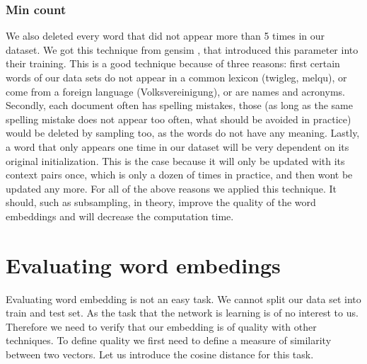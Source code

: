 \subsubsection{Min count}
We also deleted every word that did not appear more than 5 times in our dataset. We got this technique from gensim \cite{gensim}, that introduced this parameter into their training. This is a good technique because of three reasons: first certain words of our data sets do not appear in a common lexicon (twigleg, melqu), or come from a foreign language (Volksvereinigung), or are names and acronyms. Secondly, each document often has spelling mistakes, those (as long as the same spelling mistake does not appear too often, what should be avoided in practice) would be deleted by sampling too, as the words do not have any meaning. Lastly, a word that only appears one time in our dataset will be very dependent on its original initialization. This is the case because it will only be updated with its context pairs once, which is only a dozen of times in practice, and then wont be updated any more. For all of the above reasons we applied this technique. It should, such as subsampling, in theory, improve the quality of the word embeddings and will decrease the computation time. 

\section{Evaluating word embedings}
Evaluating word embedding is not an easy task. We cannot split our data set into train and test set. As the task that the network is learning is of no interest to us. Therefore we need to verify that our embedding is of quality with other techniques. To define quality we first need to define a measure of similarity between two vectors. Let us introduce the cosine distance for this task. 
